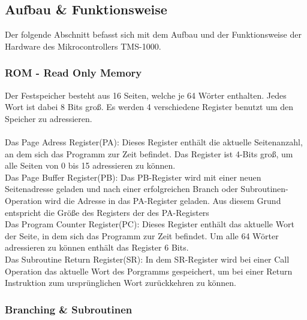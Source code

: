 \subsection{Aufbau \& Funktionsweise}

Der folgende Abschnitt befasst sich mit dem Aufbau und der Funktionsweise der Hardware des Mikrocontrollers TMS-1000. 

\subsubsection{ROM - Read Only Memory}

Der Festspeicher besteht aus 16 Seiten, welche je 64 W{\"o}rter enthalten. Jedes Wort ist dabei 8 Bits gro{\ss}. Es werden 4 verschiedene Register benutzt um den Speicher zu adressieren. \\
\\
Das Page Adress Register(PA): Dieses Register enth{\"a}lt die aktuelle Seitenanzahl, an dem sich das Programm zur Zeit befindet. Das Register ist 4-Bits gro{\ss}, um alle Seiten von 0 bis 15 adressieren zu k{\"o}nnen. \\
Das Page Buffer Register(PB): Das PB-Register wird mit einer neuen Seitenadresse geladen und nach einer erfolgreichen Branch oder Subroutinen-Operation wird die Adresse in das PA-Register geladen. Aus diesem Grund entspricht die Gr{\"o}{\ss}e des Registers der des PA-Registers \\
Das Program Counter Register(PC): Dieses Register enth{\"a}lt das aktuelle Wort der Seite, in dem sich das Programm zur Zeit befindet. Um alle 64 W{\"o}rter adressieren zu k{\"o}nnen enth{\"a}lt das Register 6 Bits. \\
Das Subroutine Return Register(SR): In dem SR-Register wird bei einer Call Operation das aktuelle Wort des Porgramms gespeichert, um bei einer Return Instruktion zum urspr{\"u}nglichen Wort zur{\"u}ckkehren zu k{\"o}nnen. 

\subsubsection{Branching \& Subroutinen}

